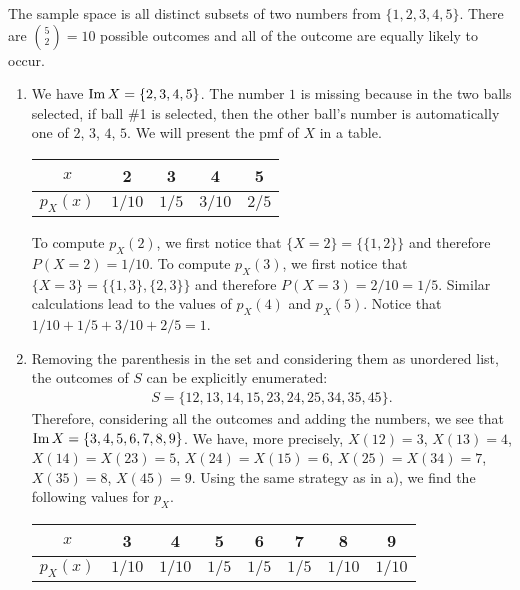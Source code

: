     \begin{problem}
    The sample space is all distinct subsets of two numbers from $\{ 1, 2, 3, 4, 5 \}$. There are $\binom{5}{2} = 10$ possible outcomes and all of the outcome are equally likely to occur. 
    \begin{enumerate}[label=\alph*)]
        \item We have $\operatorname{Im} X = \{ 2, 3, 4, 5 \}$. The number $1$ is missing because in the two balls selected, if ball \#1 is selected, then the other ball's number is automatically one of $2$, $3$, $4$, $5$. We will present the pmf of $X$ in a table.
        \begin{center}
            \begin{tabular}{c|c|c|c|c}
            $x$ & 2 & 3 & 4 & 5 \\\hline
            $p_X (x)$ & $1/10$ & $1/5$ & $3/10$ & $2/5$
            \end{tabular}
        \end{center}  
    To compute $p_X (2)$, we first notice that $\{ X = 2 \} = \{ \{ 1, 2 \} \}$ and therefore $P (X = 2) = 1/10$. To compute $p_X (3)$, we first notice that $\{ X = 3 \} = \{ \{ 1 , 3 \} , \{ 2 , 3 \} \}$ and therefore $P (X = 3) = 2/10 = 1/5$. Similar calculations lead to the values of $p_X (4)$ and $p_X (5)$. Notice that $1/10 + 1/5 + 3/10 + 2/5 = 1$. 
        \item Removing the parenthesis in the set and considering them as unordered list, the outcomes of $S$ can be explicitly enumerated:
            \begin{align*}
            S = \{ 12, 13, 14, 15, 23, 24, 25, 34, 35, 45 \} .
            \end{align*} 
        Therefore, considering all the outcomes and adding the numbers, we see that $\operatorname{Im} X = \{ 3, 4, 5, 6, 7, 8, 9 \}$. We have, more precisely, $X(12) = 3$, $X(13) = 4$, $X(14) = X(23) = 5$, $X(24) = X(15) = 6$, $X(25) = X(34) = 7$, $X(35) = 8$, $X(45) = 9$.
        Using the same strategy as in a), we find the following values for $p_X$.
        \begin{center}
            \begin{tabular}{c|c|c|c|c|c|c|c}
            $x$ & 3 & 4 & 5 & 6 & 7 & 8 & 9 \\ \hline
            $p_X (x)$ & $1/10$ & $1/10$ & $1/5$ & $1/5$ & $1/5$ & $1/10$ & $1/10$
            \end{tabular}
        \end{center}
    \end{enumerate}
    \end{problem}

